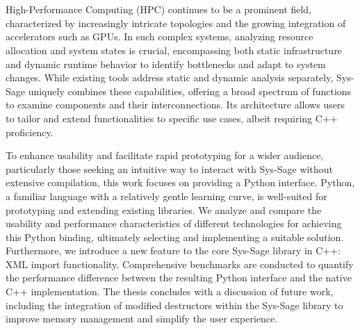 \chapter{\abstractname}

\noindent High-Performance Computing (HPC) continues to be a prominent field, characterized by increasingly intricate topologies and the growing integration of accelerators such as GPUs. In such complex systems, analyzing resource allocation and system states is crucial, encompassing both static infrastructure and dynamic runtime behavior to identify bottlenecks and adapt to system changes. While existing tools address static and dynamic analysis separately, Sys-Sage uniquely combines these capabilities, offering a broad spectrum of functions to examine components and their interconnections. Its architecture allows users to tailor and extend functionalities to specific use cases, albeit requiring C++ proficiency.   

To enhance usability and facilitate rapid prototyping for a wider audience, particularly those seeking an intuitive way to interact with Sys-Sage without extensive compilation, this work focuses on providing a Python interface. Python, a familiar language with a relatively gentle learning curve, is well-suited for prototyping and extending existing libraries. We analyze and compare the usability and performance characteristics of different technologies for achieving this Python binding, ultimately selecting and implementing a suitable solution. Furthermore, we introduce a new feature to the core Sys-Sage library in C++: XML import functionality. Comprehensive benchmarks are conducted to quantify the performance difference between the resulting Python interface and the native C++ implementation. The thesis concludes with a discussion of future work, including the integration of modified destructors within the Sys-Sage library to improve memory management and simplify the user experience.   


